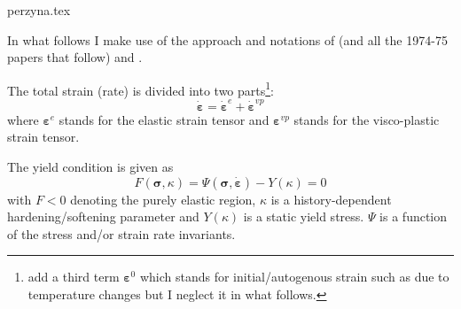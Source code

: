 \begin{flushright} {\tiny {\color{gray} perzyna.tex}} \end{flushright}

In what follows I make use of the approach and notations of \textcite{zico74} (and all 
the 1974-75 papers that follow) and \textcite{owhi}.

The total strain (rate) is divided into two parts\footnote{\textcite{zico74} 
add a third term ${\bm \varepsilon}^0$ which stands for initial/autogenous strain such as due 
to temperature changes but I neglect it in what follows.}:
\[
\dot{\bm \varepsilon} = \dot{\bm \varepsilon}^e + \dot{\bm \varepsilon}^{vp}  
\]
where ${\bm \varepsilon}^e$ stands for the elastic strain tensor and 
${\bm \varepsilon}^{vp}$ stands for the visco-plastic strain tensor.





The yield condition is given as 
\[
F({\bm \sigma},\kappa) 
= \Psi(\bm\sigma,\bm{\dot\varepsilon}) -Y(\kappa) = 0
\]
with $F<0$ denoting the purely elastic region, $\kappa$ is a 
history-dependent hardening/softening parameter and $Y(\kappa)$ is a static yield stress.
$\Psi$ is a function of the stress and/or strain rate invariants.

